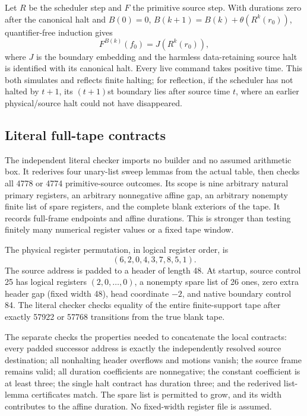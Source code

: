 \documentclass[11pt,a4paper]{article}
\newcommand{\file}[1]{\texttt{\path{#1}}}
\begin{document}
Let $R$ be the scheduler step and $F$ the primitive source step.
With durations zero after the canonical halt and
$B(0)=0$, $B(k+1)=B(k)+\theta(R^k(r_0))$, quantifier-free
induction gives
\[
 F^{B(k)}(f_0)=J(R^k(r_0)),
\]
where $J$ is the boundary embedding and the harmless data-retaining
source halt is identified with its canonical halt. Every live
command takes positive time. This both simulates and reflects
finite halting; for reflection, if the scheduler has not halted by
$t+1$, its $(t+1)$st boundary lies after source time $t$, where an
earlier physical/source halt could not have disappeared.

\subsection{Literal full-tape contracts}

The independent literal checker imports no builder and no assumed
arithmetic box. It rederives four unary-list sweep lemmas from the
actual table, then checks all 4778 or 4774 primitive-source outcomes.
Its scope is nine arbitrary natural primary registers, an arbitrary
nonnegative affine gap, an arbitrary nonempty finite list of spare
registers, and the complete blank exteriors of the tape. It records
full-frame endpoints and affine durations. This is stronger than
testing finitely many numerical register values or a fixed tape
window.

The physical register permutation, in logical register order, is
\[
 (6,2,0,4,3,7,8,5,1).
\]
The source address is padded to a header of length 48. At startup,
source control 25 has logical registers $(2,0,\ldots,0)$, a
nonempty spare list of 26 ones, zero extra header gap (fixed width 48),
head coordinate $-2$, and
native boundary control 84. The literal checker checks equality of
the entire finite-support tape after exactly 57922 or 57768
transitions from the true blank tape.

The separate \file{physical_ipra_audit.py} checks the properties
needed to concatenate the local contracts: every padded successor
address is exactly the independently resolved source destination;
all nonhalting header overflows and motions vanish; the source
frame remains valid; all duration coefficients are nonnegative;
the constant coefficient is at least three; the single halt
contract has duration three; and the rederived list-lemma
certificates match. The spare list is permitted to grow, and its
width contributes to the affine duration. No fixed-width register
file is assumed.
\end{document}
